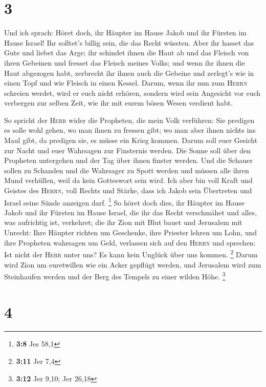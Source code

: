 \hypertarget{section-1}{%
\section{3}\label{section-1}}

 Und ich sprach: Höret doch, ihr Häupter im Hause Jakob
und ihr Fürsten im Hause Israel! Ihr solltet's billig sein, die das
Recht wüssten.  Aber ihr hasset das Gute und liebet das
Arge; ihr schindet ihnen die Haut ab und das Fleisch von ihren Gebeinen
 und fresset das Fleisch meines Volks; und wenn ihr ihnen
die Haut abgezogen habt, zerbrecht ihr ihnen auch die Gebeine und
zerlegt's wie in einen Topf und wie Fleisch in einen Kessel.
 Darum, wenn ihr nun zum \textsc{Herrn} schreien werdet,
wird er euch nicht erhören, sondern wird sein Angesicht vor euch
verbergen zur selben Zeit, wie ihr mit eurem bösen Wesen verdient habt.

 So spricht der \textsc{Herr} wider die Propheten, die
mein Volk verführen: Sie predigen es solle wohl gehen, wo man ihnen zu
fressen gibt; wo man aber ihnen nichts ins Maul gibt, da predigen sie,
es müsse ein Krieg kommen.  Darum soll euer Gesicht zur
Nacht und euer Wahrsagen zur Finsternis werden. Die Sonne soll über den
Propheten untergehen und der Tag über ihnen finster werden.
 Und die Schauer sollen zu Schanden und die Wahrsager zu
Spott werden und müssen alle ihren Mund verhüllen, weil da kein
Gotteswort sein wird.  Ich aber bin voll Kraft und Geistes
des \textsc{Herrn}, voll Rechts und Stärke, dass ich Jakob sein
Übertreten und Israel seine Sünde anzeigen darf. \footnote{\textbf{3:8}
  Jes 58,1}  So höret doch dies, ihr Häupter im Hause
Jakob und ihr Fürsten im Hause Israel, die ihr das Recht verschmähet und
alles, was aufrichtig ist, verkehret;  die ihr Zion mit
Blut bauet und Jerusalem mit Unrecht:  Ihre Häupter
richten um Geschenke, ihre Priester lehren um Lohn, und ihre Propheten
wahrsagen um Geld, verlassen sich auf den \textsc{Herrn} und sprechen:
Ist nicht der \textsc{Herr} unter uns? Es kann kein Unglück über uns
kommen. \footnote{\textbf{3:11} Jer 7,4}  Darum wird Zion
um euretwillen wie ein Acker gepflügt werden, und Jerusalem wird zum
Steinhaufen werden und der Berg des Tempels zu einer wilden Höhe.
\footnote{\textbf{3:12} Jer 9,10; Jer 26,18}

\hypertarget{section-2}{%
\section{4}\label{section-2}}

